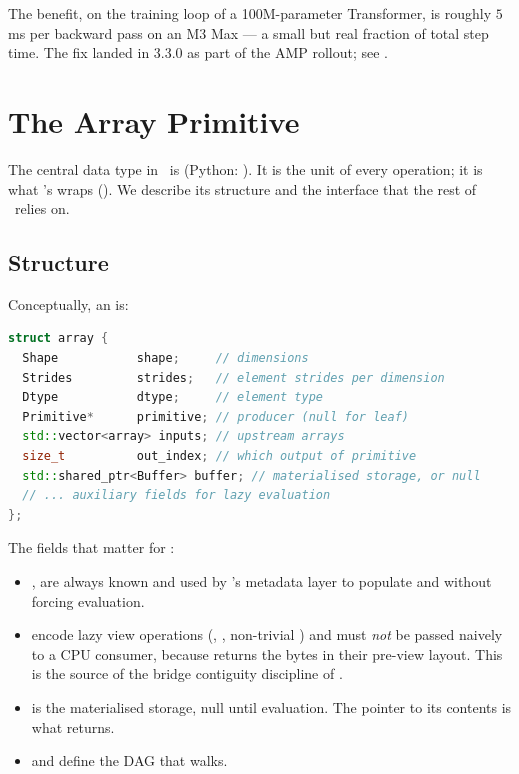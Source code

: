 The benefit, on the training loop of a 100M-parameter Transformer,
is roughly \(5\)\,ms per backward pass on an M3 Max --- a small but
real fraction of total step time. The fix landed in 3.3.0 as part of
the AMP rollout; see .

\section{The Array Primitive}
\label{sec:mlx_runtime:array}

The central data type in \MLX\ is  (Python:
). It is the unit of every operation; it is
what \Lucid's  wraps (). We
describe its structure and the interface that the rest of \Lucid\
relies on.

\subsection{Structure}
\label{ssec:mlx_runtime:array_structure}

Conceptually, an  is:

\begin{lstlisting}[style=lucidcpp,language=C++]
struct array {
  Shape           shape;     // dimensions
  Strides         strides;   // element strides per dimension
  Dtype           dtype;     // element type
  Primitive*      primitive; // producer (null for leaf)
  std::vector<array> inputs; // upstream arrays
  size_t          out_index; // which output of primitive
  std::shared_ptr<Buffer> buffer; // materialised storage, or null
  // ... auxiliary fields for lazy evaluation
};
\end{lstlisting}

The fields that matter for \Lucid:

\begin{itemize}
  \item {},  are always known and used by
    \Lucid's metadata layer to populate  and
     without forcing evaluation.
  \item {} encode lazy view operations
    (, , non-trivial ) and
    must \emph{not} be passed naively to a CPU consumer, because
    \code{data<T>()} returns the bytes in their pre-view layout.
    This is the source of the bridge contiguity discipline of
    .
  \item {} is the materialised storage, null until
    evaluation. The pointer to its contents is what
     returns.
  \item {} and  define the DAG that
     walks.
\end{itemize}

